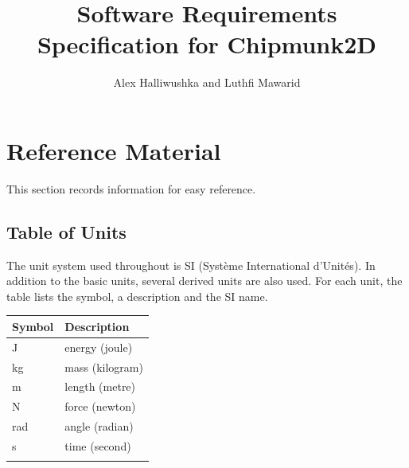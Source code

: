 \documentclass[12pt]{article}
\title{Software Requirements Specification for Chipmunk2D}
\author{Alex Halliwushka and Luthfi Mawarid}
\begin{document}
\maketitle
\tableofcontents
\newpage
\section{Reference Material}
\label{Sec:RefMat}
This section records information for easy reference.
\subsection{Table of Units}
\label{Sec:ToU}
The unit system used throughout is SI (Système International d'Unités). In addition to the basic units, several derived units are also used. For each unit, the table lists the symbol, a description and the SI name.
\begin{longtable*}{l l}
\toprule
Symbol & Description
\\
\midrule
\endhead
J & energy (joule)
\\
kg & mass (kilogram)
\\
m & length (metre)
\\
N & force (newton)
\\
rad & angle (radian)
\\
s & time (second)
\\
\bottomrule
\label{Table:ToU}
\end{longtable*}
\end{document}
